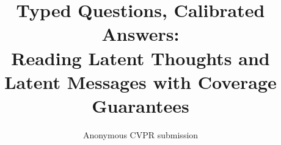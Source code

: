 \documentclass[10pt,twocolumn,letterpaper]{article}
\title{Typed Questions, Calibrated Answers:\\Reading Latent Thoughts and Latent Messages with Coverage Guarantees}
\author{Anonymous CVPR submission}
\begin{document}
\maketitle











{
\small


}

% 
\end{document}
